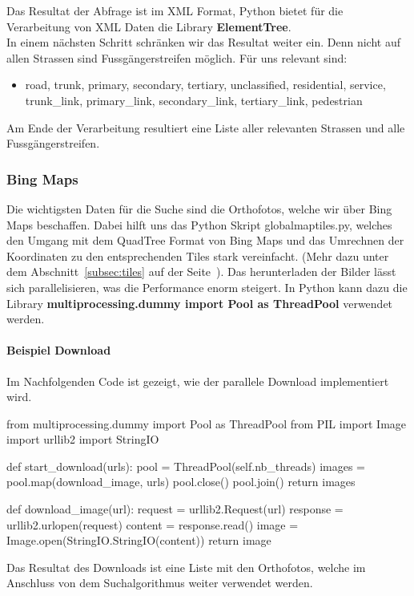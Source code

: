 Das Resultat der Abfrage ist im XML Format, Python bietet für die Verarbeitung von XML Daten die Library \textbf{ElementTree}.\\
In einem nächsten Schritt schränken wir das Resultat weiter ein. Denn nicht auf allen Strassen sind Fussgängerstreifen möglich. Für uns relevant sind:
\begin{itemize}
	\item road, trunk, primary, secondary, tertiary, unclassified, residential, service, trunk\_link, primary\_link, secondary\_link, tertiary\_link, pedestrian
\end{itemize}

Am Ende der Verarbeitung resultiert eine Liste aller relevanten Strassen und alle Fussgängerstreifen.

\subsubsection{Bing Maps}
Die wichtigsten Daten für die Suche sind die Orthofotos, welche wir über Bing Maps beschaffen. Dabei hilft uns das Python Skript globalmaptiles.py, welches den Umgang mit dem QuadTree Format von Bing Maps und das Umrechnen der Koordinaten zu den entsprechenden Tiles stark vereinfacht. (Mehr dazu unter dem Abschnitt~\ref{subsec:tiles} auf der Seite~\pageref{subsec:tiles}). Das herunterladen der Bilder lässt sich parallelisieren, was die Performance enorm steigert. In Python kann dazu die Library \textbf{multiprocessing.dummy import Pool as ThreadPool} verwendet werden.

\paragraph{Beispiel Download} Im Nachfolgenden Code ist gezeigt, wie der parallele Download implementiert wird. \\
\begin{python}
from multiprocessing.dummy import Pool as ThreadPool
from PIL import Image
import urllib2
import StringIO

def start_download(urls):
     pool = ThreadPool(self.nb_threads)       
     images = pool.map(download_image, urls)
     pool.close()
     pool.join()
     return images

def download_image(url):
    request = urllib2.Request(url)
    response = urllib2.urlopen(request)
    content = response.read()
    image = Image.open(StringIO.StringIO(content))
    return image

\end{python}

Das Resultat des Downloads ist eine Liste mit den Orthofotos, welche im Anschluss von dem Suchalgorithmus weiter verwendet werden.





